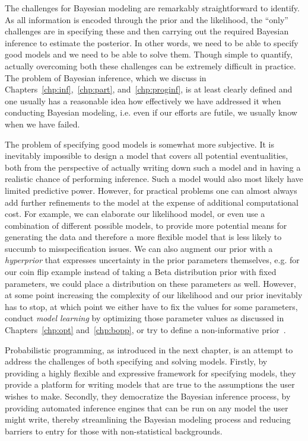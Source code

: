 The challenges for Bayesian modeling are remarkably straightforward to identify.  As all information
is encoded through the prior and the likelihood, the ``only'' challenges are in specifying these
and then carrying out the required Bayesian inference to estimate the posterior.  In other words, we need
to be able to specify good models and we need to be able to solve them.  Though simple to
quantify, actually overcoming both these challenges can be extremely difficult in practice.  The problem
of Bayesian inference, which we discuss in Chapters~\ref{chp:inf},~\ref{chp:part}, and~\ref{chp:proginf},
 is at least clearly defined and one usually has a reasonable idea
how effectively we have addressed it when conducting Bayesian modeling, i.e. even if our efforts are
futile, we usually know when we have failed.  

The problem of specifying good models is somewhat more subjective.  It is inevitably impossible
to design a model that covers all potential eventualities, both from the perspective of actually writing
down such a model and in having a realistic chance of performing inference.  Such a model
would also most likely have limited predictive power.  However, for practical problems one can almost always
add further refinements to the model at the expense of additional computational cost. For example, we can
elaborate our likelihood model, or even use a combination of different possible models, to provide more 
potential means  for generating the data and therefore a more flexible model that is less likely to 
succumb to misspecification issues.  We can also augment our prior with a \emph{hyperprior} that 
expresses uncertainty in the prior parameters themselves, e.g. for our coin flip example instead of
taking a Beta distribution prior with fixed parameters, we could place a distribution on these parameters
as well.  However, at some point increasing the complexity of our likelihood and our prior inevitably 
has to stop, at which point we either have to fix the values for some parameters, conduct
\emph{model learning} by optimizing those parameter values as discussed in Chapters~\ref{chp:opt}
and~\ref{chp:bopp}, or try to define a non-informative prior~\citep{robert2007bayesian}.


Probabilistic programming, as introduced in the next chapter, is an
attempt to address the challenges of both specifying and solving models.  
Firstly, by providing a highly flexible and expressive framework for specifying models, 
they provide a platform for writing models that are true to the assumptions the user wishes
to make.  Secondly, they democratize the Bayesian inference process, by providing automated
inference engines that can be run on any model the user might write, thereby streamlining the Bayesian
modeling process and reducing barriers to entry for those with non-statistical backgrounds.